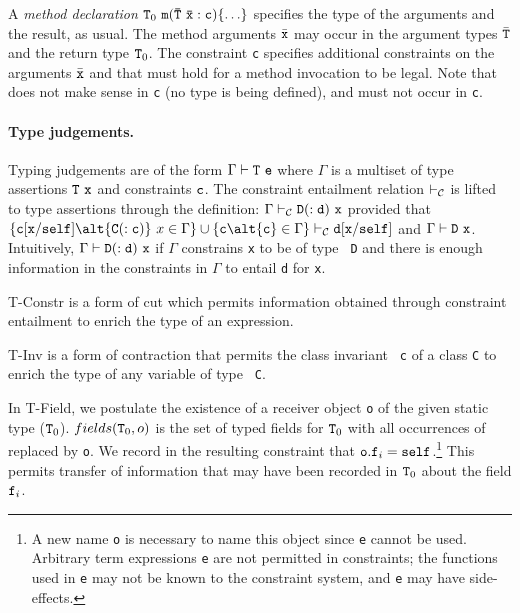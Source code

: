 A {\em method declaration} ${\tt T}_0\ {\tt m(\bar{\tt T}\ \bar{\tt x} :
c)\{\ldots\}}$ specifies the type of the arguments and the result, as
usual.  The method arguments $\bar{\tt x}$ may occur in the argument
types $\bar{\tt T}$ and the return type ${\tt T}_0$.  The constraint
{\tt c} specifies additional constraints on the arguments $\bar{\tt
x}$ and
\this{} that must hold for a method invocation to be legal. Note that
\self{} does not make sense in {\tt c} (no type is being defined), and must not occur in {\tt c}.

\paragraph{Type judgements.}
Typing judgements are of the form $\Gamma \vdash {\tt T}\ {\tt e}$
where $\Gamma$ is a multiset of type assertions ${\tt T}\ {\tt x}$ and
constraints ${\tt c}$. The constraint entailment relation
$\vdash_{\cal C}$ is lifted to type assertions through the definition:
$\Gamma \vdash_{\cal C} {\tt D(:d)}\ {\tt x}$ provided that $\{ {\tt
c}[{\tt x}/\self] \alt {\tt C(:c)}\ x \in \Gamma\} \cup
\{{\tt c} \alt  {\tt c} \in \Gamma\} \vdash_{\cal C} {\tt d}[{\tt x}/\self]
$ and $\Gamma \vdash {\tt D}\ {\tt x}$. Intuitively, $\Gamma \vdash
\tt D(:d)\ {\tt x}$ if $\Gamma$ constrains {\tt x} to be of type {\tt
D} and there is enough information in the constraints in $\Gamma$ to
entail {\tt d} for {\tt x}.

\def\TConstr{\mbox{\sc T-Constr}}
\def\TInv{\mbox{\sc T-Inv}}
\def\TField{\mbox{\sc T-Field}}
\def\TInvk{\mbox{\sc T-Invk}}
\def\TNew{\mbox{\sc T-New}}
\TConstr{} is a form of cut which permits information obtained through
constraint entailment to enrich the type of an expression.

\TInv{} is a form of contraction that permits the class invariant {\tt
c} of a class {\tt C} to enrich the type of any variable of type {\tt
C}.

In \TField, we postulate the existence of a receiver object {\tt o} of
the given static type (${\tt T}_0$). $fields({\tt T}_0,o)$ is
the set of typed fields for ${\tt T}_0$ with all occurrences of 
\this{} replaced  by {\tt o}. We record in the resulting
constraint that ${\tt o.f}_i=\self$.\footnote{A new name {\tt o} is
necessary to name this object since {\tt e} cannot be used. Arbitrary
term expressions {\tt e} are not permitted in constraints; the
functions used in {\tt e} may not be known to the constraint system,
and {\tt e} may have side-effects.}  This permits transfer of
information that may have been recorded in ${\tt T}_0$ about the field
${\tt f}_i$. 

